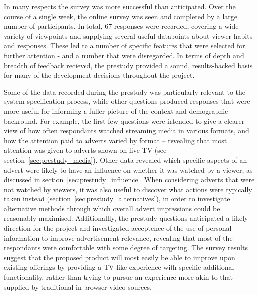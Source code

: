 In many respects the survey was more successful than anticipated.
Over the course of a single week, the online survey was seen and completed by a large number of participants.
In total, 67 responses were recorded, covering a wide variety of viewpoints and supplying several useful datapoints about viewer habits and responses.
These led to a number of specific features that were selected for further attention - and a number that were disregarded.
In terms of depth and breadth of feedback recieved, the prestudy provided a sound, results-backed basis for many of the development decisions throughout the project.

Some of the data recorded during the prestudy was particularly relevant to the system specification process, while other questions produced responses that were more useful for informing a fuller picture of the context and demographic backround.
For example, the first few questions were intended to give a clearer view of how often respondants watched streaming media in various formats, and how the attention paid to adverts varied by format -- revealing that most attention was given to adverts shown on live TV (see section~\ref{sec:prestudy_media}).
Other data revealed which specific aspects of an advert were likely to have an influence on whether it was watched by a viewer, as discussed in section~\ref{sec:prestudy_influence}.
When considering adverts that were not watched by viewers, it was also useful to discover what actions were typically taken instead (section~\ref{sec:prestudy_alternatives}), in order to investigate alternative methods through which overall advert impressions could be reasonably maximised.
Additionallly, the prestudy questions anticipated a likely direction for the project and investigated acceptence of the use of personal information to improve advertisement relevance, revealing that most of the respondants were comfortable with some degree of targeting.
The survey results suggest that the proposed product will most easily be able to improve upon existing offerings by providing a TV-like experience with specific additional functionality, rather than trying to pursue an experience more akin to that supplied by traditional in-browser video sources.

